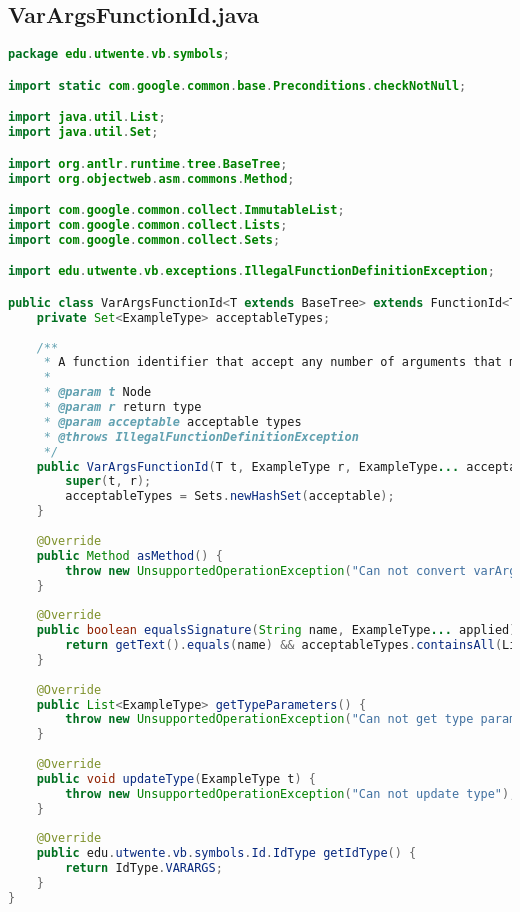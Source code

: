 \subsection{VarArgsFunctionId.java}
\begin{lstlisting}[language=Java]
package edu.utwente.vb.symbols;

import static com.google.common.base.Preconditions.checkNotNull;

import java.util.List;
import java.util.Set;

import org.antlr.runtime.tree.BaseTree;
import org.objectweb.asm.commons.Method;

import com.google.common.collect.ImmutableList;
import com.google.common.collect.Lists;
import com.google.common.collect.Sets;

import edu.utwente.vb.exceptions.IllegalFunctionDefinitionException;

public class VarArgsFunctionId<T extends BaseTree> extends FunctionId<T>{
	private Set<ExampleType> acceptableTypes;
	
	/**
	 * A function identifier that accept any number of arguments that match the list of allowed types.
	 * 
	 * @param t Node
	 * @param r return type
	 * @param acceptable acceptable types
	 * @throws IllegalFunctionDefinitionException 
	 */
	public VarArgsFunctionId(T t, ExampleType r, ExampleType... acceptable) throws IllegalFunctionDefinitionException{
		super(t, r);
		acceptableTypes = Sets.newHashSet(acceptable);
	}
	
	@Override
	public Method asMethod() {
		throw new UnsupportedOperationException("Can not convert varArgs to fixed args");
	}
	
	@Override
	public boolean equalsSignature(String name, ExampleType... applied) {
		return getText().equals(name) && acceptableTypes.containsAll(Lists.newArrayList(applied));
	}
	
	@Override
	public List<ExampleType> getTypeParameters() {
		throw new UnsupportedOperationException("Can not get type parameters");
	}
	
	@Override
	public void updateType(ExampleType t) {
		throw new UnsupportedOperationException("Can not update type");
	}	
	
	@Override
	public edu.utwente.vb.symbols.Id.IdType getIdType() {
		return IdType.VARARGS;
	}
}

\end{lstlisting}
